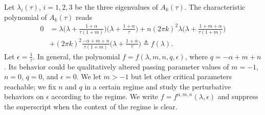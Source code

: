 \documentclass[a4paper,11pt]{article}
\theoremstyle{remark}
\begin{document}
Let $\lambda_i(\tau)$, $i=1,2,3$ be the three eigenvalues of $A_k(\tau)$. %
The characteristic polynomial of $A_k(\tau)$ reads
%
%
%
%
\begin{align}
0&= \lambda\Big(\lambda + \frac{1+\alpha}{\tau(1+m)}\Big)\Big(\lambda + \frac{1+\alpha}{\tau}\Big) + n(2\pi k)^2\lambda\Big(\lambda + \frac{1+m+\alpha}{\tau(1+m)}\Big)\nonumber\\
&+ (2\pi k)^2\frac{-\alpha+m+n}{\tau(1+m)}\Big(\lambda + \frac{1+\alpha}{\tau}\Big)\triangleq f(\lambda). \label{eq:poly}
\end{align}
Let $\epsilon = \frac{1}{\tau}$. In general, the polynomial $f=f(\lambda,m,n,q,\epsilon)$, where $q=-\alpha+m+n$. Its behavior could be qualitatively altered passing parameter values of $m=-1$, $n=0$, $q=0$, and $\epsilon=0$. We  let $m>-1$ but let other critical parameters reachable; we fix $n$ and $q$ in a certain regime and study the perturbative behaviors on $\epsilon$ according to the regime. We write $f= f^{\alpha,m,n}(\lambda,\epsilon)$ and suppress the superscript when the context of the regime is clear.
\end{document}
